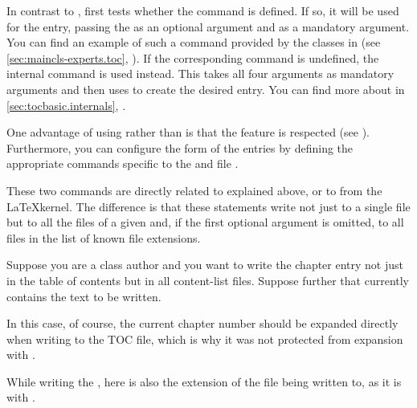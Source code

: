 In contrast to ,  first tests
whether the  command is defined.
If so, it will be used for the entry, passing the  as an
optional argument and  as a mandatory argument. You can find an
example of such a command provided by the \KOMAScript{} classes in
 (see
\autoref{sec:maincls-experts.toc},
). If the corresponding
command is undefined, the internal command
 is used instead. This takes
all four arguments as mandatory arguments and then uses
 to create the desired entry. You can find more about
 in
\autoref{sec:tocbasic.internals},
.

One advantage of using  rather than
 is that the  feature is respected
(see ). Furthermore, you can configure
the form of the entries by defining the appropriate commands specific to the
 and file .%
%
\EndIndexGroup


\begin{Declaration}
\end{Declaration}
These two commands are directly related to
explained above, or to  from the \LaTeX kernel. The
difference is that these statements write  not just to a single
file but to all the files of a given  and, if the first optional
argument is omitted, to all files in the list of known file extensions.
\begin{Example}
  Suppose you are a class author and you want to write the chapter entry not
  just in the table of contents but in all content-list files. Suppose further
  that  currently contains the text to be written.
  In this case, of course, the current chapter number should be expanded
  directly when writing to the TOC file, which is why it was not protected
  from expansion with .
\end{Example}
While writing the ,
 here is also
the extension of the file being written to, as it is with
.%

